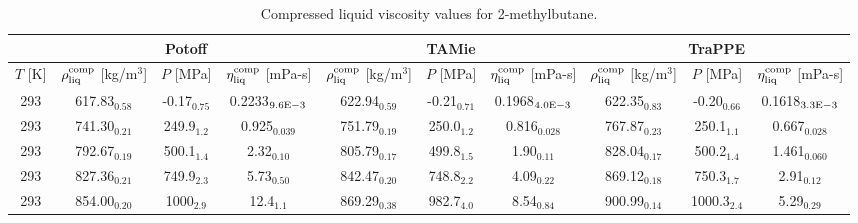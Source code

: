 \documentclass[preprint,review,11pt]{elsarticle}
\begin{document}
\begin{landscape}
	\begin{table}[H]
		\caption{Compressed liquid viscosity values for 2-methylbutane.}
		\begin{center}
			\begin{tabular}{|c|c|c|c|c|c|c|c|c|c|}
				\hline
				& \multicolumn{3}{c|}{Potoff}                                                                          & \multicolumn{3}{c|}{TAMie}                                                                              & \multicolumn{3}{c|}{TraPPE}                                                                          \\ \hline
				$T$ {[}K{]} & $\rho^{\rm comp}_{\rm liq}$ {[}kg/m$^3${]} & $P$ {[}MPa{]}  & $\eta^{\rm comp}_{\rm liq}$ {[}mPa-s{]} & $\rho^{\rm comp}_{\rm liq}$ {[}kg/m$^3${]} & $P$ {[}MPa{]}     & $\eta^{\rm comp}_{\rm liq}$ {[}mPa-s{]} & $\rho^{\rm comp}_{\rm liq}$ {[}kg/m$^3${]} & $P$ {[}MPa{]}  & $\eta^{\rm comp}_{\rm liq}$ {[}mPa-s{]} \\ \hline
				293         & 617.83$_{0.58}$                            & -0.17$_{0.75}$ & 0.2233$_{9.6 \rm E-3}$                      & 622.94$_{0.59}$                         & -0.21$_{0.71}$ & 0.1968$_{4.0 \rm E-3}$                      & 622.35$_{0.83}$                         & -0.20$_{0.66}$ & 0.1618$_{3.3 \rm E-3}$                      \\ \hline
				293         & 741.30$_{0.21}$                            & 249.9$_{1.2}$  & 0.925$_{0.039}$                        & 751.79$_{0.19}$                         & 250.0$_{1.2}$  & 0.816$_{0.028}$                        & 767.87$_{0.23}$                         & 250.1$_{1.1}$  & 0.667$_{0.028}$                        \\ \hline
				293         & 792.67$_{0.19}$                            & 500.1$_{1.4}$  & 2.32$_{0.10}$                          & 805.79$_{0.17}$                         & 499.8$_{1.5}$  & 1.90$_{0.11}$                          & 828.04$_{0.17}$                         & 500.2$_{1.4}$  & 1.461$_{0.060}$                        \\ \hline
				293         & 827.36$_{0.21}$                            & 749.9$_{2.3}$  & 5.73$_{0.50}$                          & 842.47$_{0.20}$                         & 748.8$_{2.2}$  & 4.09$_{0.22}$                          & 869.12$_{0.18}$                         & 750.3$_{1.7}$  & 2.91$_{0.12}$                          \\ \hline
				293         & 854.00$_{0.20}$                            & 1000$_{2.9}$   & 12.4$_{1.1}$                           & 869.29$_{0.38}$                         & 982.7$_{4.0}$  & 8.54$_{0.84}$                          & 900.99$_{0.14}$                         & 1000.3$_{2.4}$ & 5.29$_{0.29}$                          \\ \hline
			\end{tabular}
		\end{center}
	\end{table}


\end{landscape}
\end{document}

